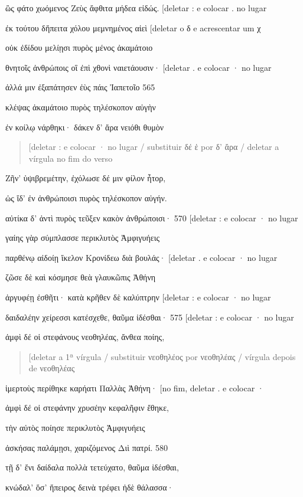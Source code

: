 ὣς φάτο χωόμενος Ζεὺς ἄφθιτα μήδεα εἰδώς. {[}deletar : e colocar . no
lugar

ἐκ τούτου δἤπειτα χόλου μεμνημένος αἰεὶ {[}deletar o δ e acrescentar um
χ

οὐκ ἐδίδου μελίῃσι πυρὸς μένος ἀκαμάτοιο

θνητοῖς ἀνθρώποις οἳ ἐπὶ χθονὶ ναιετάουσιν· {[}deletar . e colocar · no
lugar

ἀλλά μιν ἐξαπάτησεν ἐὺς πάις Ἰαπετοῖο 565

κλέψας ἀκαμάτοιο πυρὸς τηλέσκοπον αὐγὴν

ἐν κοίλῳ νάρθηκι· δάκεν δ' ἄρα νειόθι θυμὸν

\begin{quote}
{[}deletar : e colocar · no lugar / substituir δέ ἑ por δ' ἄρα / deletar
a vírgula no fim do verso
\end{quote}

Ζῆν' ὑψιβρεμέτην, ἐχόλωσε δέ μιν φίλον ἦτορ,

ὡς ἴδ' ἐν ἀνθρώποισι πυρὸς τηλέσκοπον αὐγήν.

αὐτίκα δ' ἀντὶ πυρὸς τεῦξεν κακὸν ἀνθρώποισι· 570 {[}deletar : e colocar
· no lugar

γαίης γὰρ σύμπλασσε περικλυτὸς Ἀμφιγυήεις

παρθένῳ αἰδοίῃ ἴκελον Κρονίδεω διὰ βουλάς· {[}deletar . e colocar · no
lugar

ζῶσε δὲ καὶ κόσμησε θεὰ γλαυκῶπις Ἀθήνη

ἀργυφέῃ ἐσθῆτι· κατὰ κρῆθεν δὲ καλύπτρην {[}deletar : e colocar · no
lugar

δαιδαλέην χείρεσσι κατέσχεθε, θαῦμα ἰδέσθαι· 575 {[}deletar : e colocar
· no lugar

ἀμφὶ δέ οἱ στεφάνους νεοθηλέας, ἄνθεα ποίης,

\begin{quote}
{[}deletar a 1ª vírgula / substituir νεοθηλέος por νεοθηλέας / vírgula
depois de νεοθηλέας
\end{quote}

ἱμερτοὺς περίθηκε καρήατι Παλλὰς Ἀθήνη· {[}no fim, deletar . e colocar ·

ἀμφὶ δέ οἱ στεφάνην χρυσέην κεφαλῆφιν ἔθηκε,

τὴν αὐτὸς ποίησε περικλυτὸς Ἀμφιγυήεις

ἀσκήσας παλάμῃσι, χαριζόμενος Διὶ πατρί. 580

τῇ δ' ἔνι δαίδαλα πολλὰ τετεύχατο, θαῦμα ἰδέσθαι,

κνώδαλ' ὅσ' ἤπειρος δεινὰ τρέφει ἠδὲ θάλασσα·

